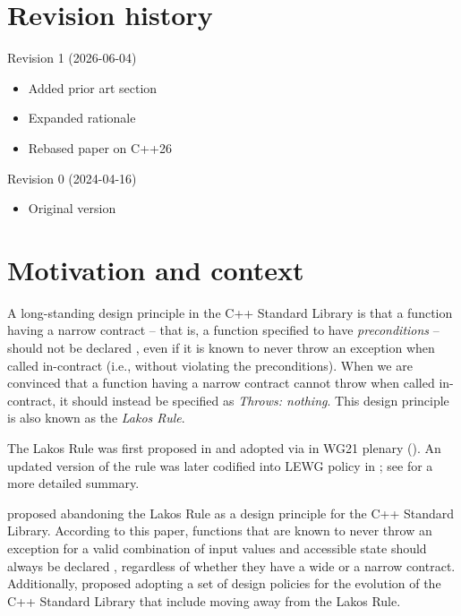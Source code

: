 
\tableofcontents*


\section*{Revision history}

Revision 1 (2026-06-04)
\begin{itemize}
\item Added prior art section
\item Expanded rationale
\item Rebased paper on C++26
\end{itemize}

Revision 0 (2024-04-16)
\begin{itemize}
\item Original version
\end{itemize}

\pagebreak


\section{Motivation and context}
\label{sec:intro}

A long-standing design principle in the C++ Standard Library is that a function having a narrow contract -- that is, a function specified to have \emph{preconditions} -- should not be declared , even if it is known to never throw an exception when called in-contract (i.e., without violating the preconditions). When we are convinced that a function having a narrow contract cannot throw when called in-contract, it should instead be specified as \emph{Throws: nothing}. This design principle is also known as the \emph{Lakos Rule}.

The Lakos Rule was first proposed in \cite{N3248} and adopted via \cite{N3279} in WG21 plenary (\cite{N3279}). An updated version of the rule was later codified into LEWG policy in \cite{P0884R0}; see \cite{O'Dwyer2018} for a more detailed summary.

\cite{P1656R2} proposed abandoning the Lakos Rule as a design principle for the C++ Standard Library. According to this paper, functions that are known to never throw an exception for a valid combination of input values and accessible state should always be declared , regardless of whether they have a wide or a narrow contract. Additionally, \cite{P2148R0} proposed adopting a set of design policies for the evolution of the C++ Standard Library that include moving away from the Lakos Rule.


